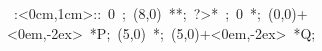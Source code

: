 \hbox{
\xy    <1cm,0cm>:<0cm,1cm>::
       0 ; (8,0) **\dir{-}; ?>* \dir{>};
       0 *{\bullet};
       (0,0)+<0em,-2ex> *{P};
       (5,0) *{\bullet};
       (5,0)+<0em,-2ex> *{Q};
       \endxy}
